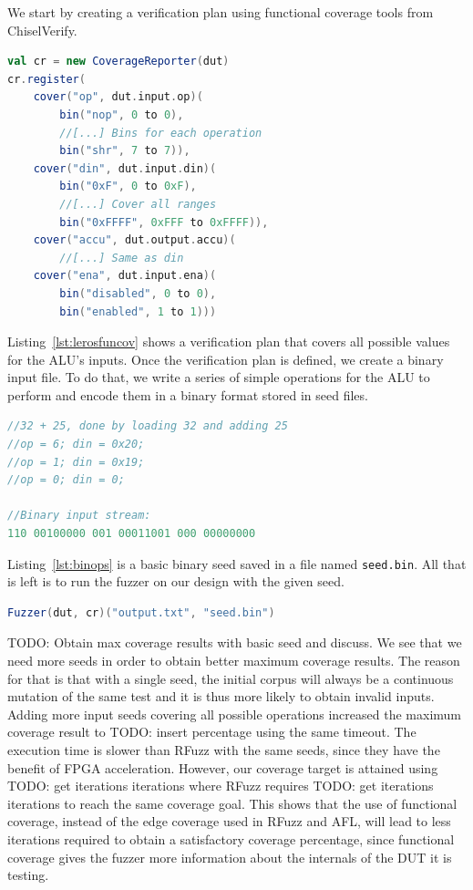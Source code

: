 \documentclass[conference]{IEEEtran}
\newcommand{\todo}[1]{{\color{olive} TODO: #1}}
\begin{document}
We start by creating a verification plan using functional coverage tools from ChiselVerify.
\begin{lstlisting}[captionpos=b,caption={Simple verification plan for the leros ALU. Since this is still a work-in-progress, the verification plan is simple and only contains basic cover points. The functional coverage code is also abridged since it is not our main focus in this paper.},label={lst:lerosfuncov},language=scala]
val cr = new CoverageReporter(dut)
cr.register(
    cover("op", dut.input.op)(
        bin("nop", 0 to 0),
        //[...] Bins for each operation
        bin("shr", 7 to 7)),
    cover("din", dut.input.din)(
        bin("0xF", 0 to 0xF),
        //[...] Cover all ranges
        bin("0xFFFF", 0xFFF to 0xFFFF)),
    cover("accu", dut.output.accu)(
        //[...] Same as din
    cover("ena", dut.input.ena)(
        bin("disabled", 0 to 0),
        bin("enabled", 1 to 1)))
\end{lstlisting}
Listing~\ref{lst:lerosfuncov} shows a verification plan that covers all possible values for the ALU's inputs.
Once the verification plan is defined, we create a binary input file.
To do that, we write a series of simple operations for the ALU to perform and encode them in a binary format stored in seed files.
\begin{lstlisting}[captionpos=b,caption={Basic ALU operations; dut.io.op is 3 bits wide and din is 8 bits wide. Each binary input in the example is separated with a whitespace for clarity.},label={lst:binops},language=C]
//32 + 25, done by loading 32 and adding 25 
//op = 6; din = 0x20; 
//op = 1; din = 0x19;
//op = 0; din = 0;

//Binary input stream:
110 00100000 001 00011001 000 00000000
\end{lstlisting}
Listing~\ref{lst:binops} is a basic binary seed saved in a file named \texttt{seed.bin}.
All that is left is to run the fuzzer on our design with the given seed.
\begin{lstlisting}[captionpos=b,caption={Call to the fuzzer using the setup previously described.},label={lst:fuzzcall},language=scala]
Fuzzer(dut, cr)("output.txt", "seed.bin")
\end{lstlisting}

\todo{Obtain max coverage results with basic seed and discuss.}
We see that we need more seeds in order to obtain better maximum coverage results. 
The reason for that is that with a single seed, the initial corpus will always be a continuous mutation of the same test and it is thus more likely to obtain invalid inputs.
Adding more input seeds covering all possible operations increased the maximum coverage result to \todo{insert percentage} using the same timeout.
The execution time is slower than RFuzz with the same seeds, since they have the benefit of FPGA acceleration.
However, our coverage target is attained using \todo{get iterations} iterations where RFuzz requires \todo{get iterations} iterations to reach the same coverage goal.
This shows that the use of functional coverage, instead of the edge coverage used in RFuzz and AFL, will lead to less iterations required to obtain a satisfactory coverage percentage, since functional coverage gives the fuzzer more information about the internals of the DUT it is testing.
\end{document}
